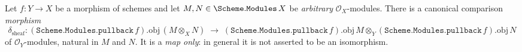 

\begin{lemma}\leanok
  \label{lem:pullback_tensor_map}
  Let \(f : Y \to X\) be a morphism of schemes and let
  \(M, N \in \Scheme.\mathtt{Modules}\,X\) be \emph{arbitrary} \(\mathcal{O}_X\)-modules.
  There is a canonical comparison \emph{morphism}
  \[
    \delta_{\mathrm{sheaf}} :
      (\mathtt{Scheme.Modules.pullback}\,f).\mathrm{obj}\,(M \otimes_X N)
      \;\longrightarrow\;
      (\mathtt{Scheme.Modules.pullback}\,f).\mathrm{obj}\,M
        \otimes_Y (\mathtt{Scheme.Modules.pullback}\,f).\mathrm{obj}\,N
  \]
  of \(\mathcal{O}_Y\)-modules, natural in \(M\) and \(N\). It is a \emph{map only}: in
  general it is not asserted to be an isomorphism.
\end{lemma}

